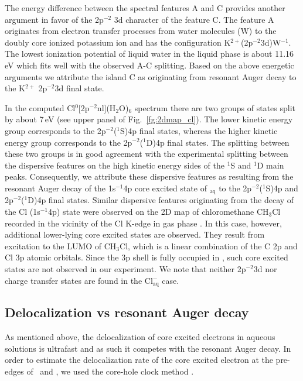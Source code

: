 The energy difference between the spectral features A and C provides another argument in favor of the 2p$^{-2}$ 3d character of the feature C. The feature A originates from electron transfer processes from water molecules (W) to the doubly core ionized potassium ion and has the configuration K$^{2+}$(2p$^{-2}$3d)W$^{-1}$. The lowest ionization potential of liquid water in the liquid phase is about 11.16\,eV \cite{winter04:2625} which fits well with the observed A-C splitting. Based on the above energetic arguments we attribute the island C as originating from resonant Auger decay to the K$^{2+}$ 2p$^{-2}$3d final state.


In the computed Cl$^{0}$[2p$^{-2}$nl](H$_2$O)$_6$ spectrum there are two groups of states split by about 7\,eV (see upper panel of Fig.\ \ref{fg:2dmap_cl}). The lower kinetic energy group corresponds to the 2p$^{-2}$($^1$S)4p final states, whereas the higher kinetic energy group corresponds to the 2p$^{-2}$($^1$D)4p final states. The splitting between these two groups is in good agreement with the experimental splitting between the dispersive features on the high kinetic energy sides of the $^1$S and $^1$D main peaks. Consequently, we attribute these dispersive features as resulting from the resonant Auger decay of the 1s$^{-1}$4p core excited state of \cli$_{\text{aq}}$ to the 2p$^{-2}$($^1$S)4p and  2p$^{-2}$($^1$D)4p final states. Similar dispersive features originating from the decay of the Cl (1s$^{-1}$4p) state were observed on the 2D map of chloromethane CH$_3$Cl recorded in the vicinity of the Cl K-edge in gas phase \cite{gold16:133001}. In this case, however, additional lower-lying core excited states are observed. They result from excitation to the LUMO of CH$_3$Cl, which is a linear combination of the C 2p and Cl 3p atomic orbitals. Since the 3p shell is fully occupied in \cli, such core excited states are not observed in our experiment. We note that neither 2p$^{-2}$3d nor charge transfer states are found in the Cl$^{-}_{\text{aq}}$ case.


\subsection{Delocalization vs resonant Auger decay}

As mentioned above, the delocalization of core excited electrons in aqueous solutions is ultrafast and as such it competes with the resonant Auger decay. In order to estimate the delocalization rate of the core excited electron at the pre-edges of \ki~and \cli, we used the core-hole clock method \cite{bjorneholm92:1892,karis96:1380}.

